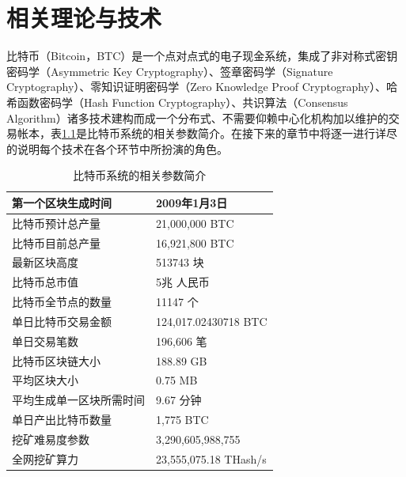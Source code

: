  
\chapter{相关理论与技术}
	
		⽐特币（Bitcoin，BTC）是⼀个点对点式的电⼦现⾦系统，集成了非对称式密钥密码学（Asymmetric Key Cryptography）\supercite{AsymmetricKeyCryptography}、签章密码学（Signature Cryptography）\supercite{Apublickeycryptosystemandasignatureschemebasedondiscretelogarithms}、零知识证明密码学（Zero Knowledge Proof Cryptography）\supercite{Zero-KnowledgeProofsofIdentity}、哈希函数密码学（Hash Function Cryptography）、共识算法（Consensus Algorithm）\supercite{Anonymousbyzantineconsensusfrommoderately-hardpuzzles:Amodelforbitcoin}诸多技术建构而成一个分布式、不需要仰赖中心化机构加以维护的交易帐本，表\ref{IntroductiontoBitcoin}是比特币系统的相关参数简介。在接下来的章节中将逐一进行详尽的说明每个技术在各个环节中所扮演的角色。

		\begin{table}[!htbp]
		\centering
		\caption{比特币系统的相关参数简介}
		\label{IntroductiontoBitcoin}
		\begin{tabular}{|l|l|}
		\hline
		第一个区块生成时间 & 2009年1月3日 \\ \hline
		比特币预计总产量 & 21,000,000 BTC \\ \hline
		比特币目前总产量 & 16,921,800 BTC \\ \hline
		最新区块高度 & 513743 块 \\ \hline
		比特币总市值 & 5兆 人民币 \\ \hline
		比特币全节点的数量 & 11147 个 \\ \hline
		单日比特币交易金额 & 124,017.02430718 BTC \\ \hline
		单日交易笔数 & 196,606 笔 \\ \hline
		比特币区块链大小 & 188.89 GB \\ \hline
		平均区块大小 & 0.75 MB \\ \hline
		平均生成单一区块所需时间 & 9.67 分钟 \\ \hline
		单日产出比特币数量 & 1,775 BTC \\ \hline
		挖矿难易度参数 & 3,290,605,988,755 \\ \hline
		全网挖矿算力 & 23,555,075.18 THash/s \\ \hline
		\end{tabular}
		\end{table}
		
